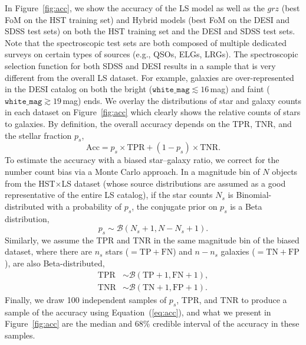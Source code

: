 \documentclass[twocolumn,tighten]{aastex631}
\begin{document}
\begin{CJK*}{UTF8}{gbsn}
In Figure~\ref{fig:acc}, we show the accuracy of the LS model as well as the $grz$ (best FoM on the HST training set) and Hybrid models (best FoM on the DESI and SDSS test sets) on both the HST training set and the DESI and SDSS test sets. Note that the spectroscopic test sets are both composed of multiple dedicated surveys on certain types of sources (e.g., QSOs, ELGs, LRGs). The spectroscopic selection function for both SDSS and DESI results in a sample that is very different from the overall LS dataset. For example, galaxies are over-represented in the DESI catalog on both the bright ($\texttt{white\_mag}\lesssim16$\,mag) and faint ($\texttt{white\_mag}\gtrsim19$\,mag) ends.
We overlay the distributions of star and galaxy counts in each dataset on Figure~\ref{fig:acc} which clearly shows the relative counts of stars to galaxies. By definition, the overall accuracy depends on the TPR, TNR, and the stellar fraction $p_s$,
\begin{equation}\label{eq:acc}
    \mathrm{Acc} = p_s\times\mathrm{TPR} + (1-p_s)\times\mathrm{TNR}.
\end{equation}
To estimate the accuracy with a biased star--galaxy ratio, we correct for the number count bias via a Monte Carlo approach. In a magnitude bin of $N$ objects from the HST$\times$LS dataset (whose source distributions are assumed as a good representative of the entire LS catalog), if the star counts $N_s$ is Binomial-distributed with a probability of $p_s$, the conjugate prior on $p_s$ is a Beta distribution, 
\begin{equation*}
    p_s\sim\mathcal{B}(N_s+1, N-N_s+1).
\end{equation*}
Similarly, we assume the TPR and TNR in the same magnitude bin of the biased dataset, where there are $n_s$ stars ($=$$\mathrm{TP+FN}$) and $n-n_s$ galaxies ($=$$\mathrm{TN+FP}$), are also Beta-distributed,
\begin{equation*}
    \begin{aligned}
        \mathrm{TPR}&\sim\mathcal{B}(\mathrm{TP}+1, \mathrm{FN}+1),\\
        \mathrm{TNR}&\sim\mathcal{B}(\mathrm{TN}+1, \mathrm{FP}+1).
    \end{aligned}
\end{equation*}
Finally, we draw 100 independent samples of $p_s$, TPR, and TNR to produce a sample of the accuracy using Equation~(\ref{eq:acc}), and what we present in Figure~\ref{fig:acc} are the median and 68\% credible interval of the accuracy in these samples.


\end{CJK*}
\end{document}
